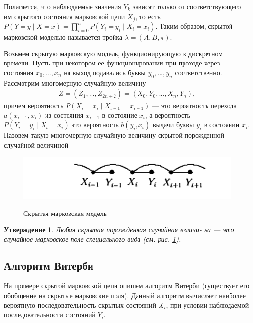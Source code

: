 \documentclass[12pt]{article}
\newtheorem{utv}{Утверждение}
\begin{document}
Полагается, что наблюдаемые значения $Y_k$ зависят только от соответствующего им скрытого состояния марковской цепи $X_j$, то есть $P(Y = y \mid X = x) = \prod\limits_{i = 0}^{n} P(Y_i = y_i \mid X_i = x_i)$. Таким образом, скрытой
марковской моделью называется тройка $\lambda = (A, B, \pi)$.

Возьмем скрытую марковскую модель, функционирующую в дискретном времени. Пусть при некотором ее функционировании при проходе через состояния $x_0, \ldots, x_n$ на выход подавались буквы $y_0, \ldots, y_n$ соответственно. Рассмотрим многомерную случайную
величину
\begin{gather*}
Z = (Z_1, \ldots, Z_{2n + 2}) = (X_0, Y_0, \ldots, X_n, Y_n),
\end{gather*}
причем вероятность $P(X_i = x_i \mid X_{i-1} = x_{i-1})$ --- это вероятность перехода $a(x_{i-1}, x_{i})$ из состояния $x_{i-1}$ в состояние $x_i$, а вероятность $P(Y_i  = y_i \mid X_i = x_i)$ это вероятность $b(y_i, x_i)$ выдачи буквы $y_i$ в состоянии $x_i$. Назовем такую многомерную случайную величину скрытой порожденной случайной величиной.
\begin{figure}[h!]
\includegraphics[width=.8\linewidth]{./figures/hmm.jpg}
\label{fig:hmm}
\caption{Скрытая марковская модель}
\end{figure}
\begin{utv}
Любая скрытая порожденная случайная величи-
на — это случайное марковское поле специального вида (см. рис. \ref{fig:hmm}).
\end{utv}
\subsection{Алгоритм Витерби}
На примере скрытой марковской цепи опишем алгоритм Витерби (существует его обобщение на скрытые марковские поля).
Данный алгоритм вычисляет наиболее вероятную последовательность скрытых состояний $X_i$, при условии наблюдаемой последовательности состояний $Y_i$. 
\end{document}
